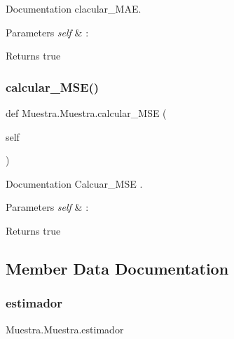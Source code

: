 Documentation clacular\+\_\+\+M\+AE. 


\begin{DoxyParams}{Parameters}
{\em self} & \+: \\
\hline
\end{DoxyParams}
\begin{DoxyReturn}{Returns}
true 
\end{DoxyReturn}
\mbox{\label{class_muestra_1_1_muestra_a707ad436d9bf675784c9e9beec5be678}} 
\subsubsection{\texorpdfstring{calcular\+\_\+\+M\+S\+E()}{calcular\_MSE()}}
{\footnotesize\ttfamily def Muestra.\+Muestra.\+calcular\+\_\+\+M\+SE (\begin{DoxyParamCaption}\item[{}]{self }\end{DoxyParamCaption})}



Documentation Calcuar\+\_\+\+M\+SE . 


\begin{DoxyParams}{Parameters}
{\em self} & \+: \\
\hline
\end{DoxyParams}
\begin{DoxyReturn}{Returns}
true 
\end{DoxyReturn}


\subsection{Member Data Documentation}
\mbox{\label{class_muestra_1_1_muestra_abf776dce58d2e68ff0988d96d6f2fa1b}} 
\subsubsection{\texorpdfstring{estimador}{estimador}}
{\footnotesize\ttfamily Muestra.\+Muestra.\+estimador}

\mbox{\label{class_muestra_1_1_muestra_ab0f909db1b6d6ece313843239809a416}} 
